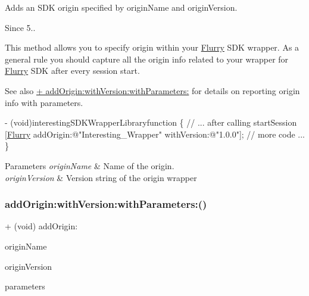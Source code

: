 Adds an S\+DK origin specified by {\ttfamily origin\+Name} and {\ttfamily origin\+Version}. 

\begin{DoxySince}{Since}
5..
\end{DoxySince}
This method allows you to specify origin within your \hyperlink{interfaceFlurry}{Flurry} S\+DK wrapper. As a general rule you should capture all the origin info related to your wrapper for \hyperlink{interfaceFlurry}{Flurry} S\+DK after every session start.

\begin{DoxySeeAlso}{See also}
\hyperlink{interfaceFlurry_a7c107ebf08e647b5fbe70920e3b31c57}{+ add\+Origin\+:with\+Version\+:with\+Parameters\+:} for details on reporting origin info with parameters. ~\newline
 
\begin{DoxyCode}
   - (void)interestingSDKWrapperLibraryfunction
\{
    \textcolor{comment}{// ... after calling startSession}
    [\hyperlink{interfaceFlurry}{Flurry} addOrigin:\textcolor{stringliteral}{@"Interesting\_Wrapper"} withVersion:\textcolor{stringliteral}{@"1.0.0"}];
    \textcolor{comment}{// more code ...}
\}
\end{DoxyCode}

\end{DoxySeeAlso}

\begin{DoxyParams}{Parameters}
{\em origin\+Name} & Name of the origin. \\
\hline
{\em origin\+Version} & Version string of the origin wrapper \\
\hline
\end{DoxyParams}
\mbox{\label{interfaceFlurry_a7c107ebf08e647b5fbe70920e3b31c57}} 
\subsubsection{\texorpdfstring{add\+Origin\+:with\+Version\+:with\+Parameters\+:()}{addOrigin:withVersion:withParameters:()}}
{\footnotesize\ttfamily + (void) add\+Origin\+: \begin{DoxyParamCaption}\item[{(N\+S\+String $\ast$)}]{origin\+Name }\item[{withVersion:(N\+S\+String $\ast$)}]{origin\+Version }\item[{withParameters:(N\+S\+Dictionary $\ast$)}]{parameters }\end{DoxyParamCaption}}




